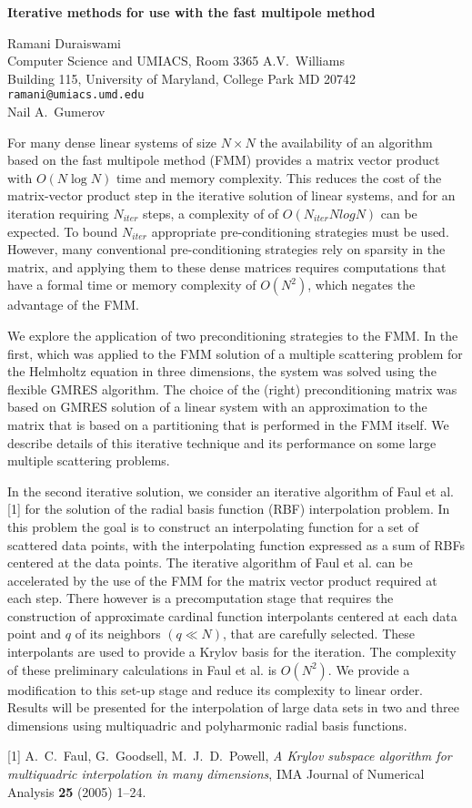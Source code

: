 \documentclass{report}
\begin{document}

\begin{center}
{\large
{\bf Iterative methods for use with the fast multipole method}}

	Ramani Duraiswami \\
	Computer Science and UMIACS, Room 3365 A.V.~Williams \\
	Building 115, University of Maryland, College Park MD 20742 \\
	{\tt ramani@umiacs.umd.edu} \\
	Nail A.~Gumerov
\end{center}
For many dense linear systems of size $N\times N$ the
availability of an algorithm based on the fast multipole
method (FMM) provides a matrix vector product with
$O(N \log N)$
time and memory complexity. This reduces the cost of the
matrix-vector product step in the iterative solution of
linear systems, and for an iteration requiring $N_{iter}$
steps, a complexity of of $O(N_{iter}NlogN)$ can be
expected. To bound $N_{iter}$ appropriate pre-conditioning
strategies must be used. However, many conventional
pre-conditioning strategies rely on sparsity in the matrix,
and applying them to these dense matrices requires
computations that have a formal time or memory complexity of
$O(N^2)$, which negates the advantage of the FMM.

We
explore the application of two preconditioning strategies to
the FMM. In the first, which was applied to the FMM solution
of a multiple scattering problem for the Helmholtz equation
in three dimensions, the system was solved using the
flexible GMRES algorithm. The choice of the (right)
preconditioning matrix was based on GMRES solution of a
linear system with an approximation to the matrix that is
based on a partitioning that is performed in the FMM itself.
We describe details of this iterative technique and its
performance on some large multiple scattering problems.


In the second iterative solution, we consider an iterative
algorithm of Faul et al. [1] for the solution of the
radial basis function (RBF) interpolation problem. In this
problem the goal is to construct an interpolating function
for a set of scattered data points, with the interpolating
function expressed as a sum of RBFs centered at the data
points. The iterative algorithm of Faul et al. can be
accelerated by the use of the FMM for the matrix vector
product required at each step. There however is a
precomputation stage that requires the construction of
approximate cardinal function interpolants centered at each
data point and $q$ of its neighbors $(q\ll N)$, that are
carefully selected. These interpolants are used to provide a
Krylov basis for the iteration. The complexity of these
preliminary calculations in Faul et al. is $O(N^2)$.
We provide a modification to this set-up stage and reduce
its complexity to linear order. Results will be presented
for the interpolation of large data sets in two and three
dimensions using multiquadric and polyharmonic radial basis
functions.

[1] A.~C.~Faul, G.~Goodsell, M.~J.~D.~Powell,
{\em A Krylov subspace algorithm for multiquadric interpolation
in many dimensions}, IMA Journal of Numerical Analysis
{\bf 25} (2005) 1--24.



\end{document}
